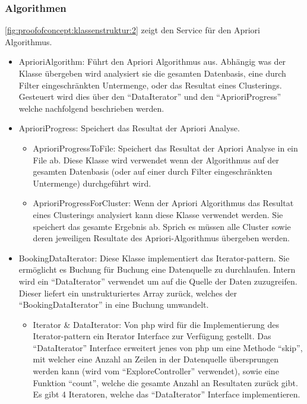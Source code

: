 \subsubsection{Algorithmen}
\label{sec:proofofconcept:klassenstruktur:algorithmen}
\cref{fig:proofofconcept:klassenstruktur:2} zeigt den Service für den Apriori Algorithmus.
\begin{itemize}
	\item AprioriAlgorithm: Führt den Apriori Algorithmus aus. Abhängig was der Klasse übergeben wird analysiert sie die gesamten Datenbasis, eine durch Filter eingeschränkten Untermenge, oder das Resultat eines Clusterings. Gesteuert wird dies über den "`DataIterator"' und den "`AprioriProgress"' welche nachfolgend beschrieben werden.
	\item AprioriProgress: Speichert das Resultat der Apriori Analyse. 
	\begin{itemize}
		\item AprioriProgressToFile: Speichert das Resultat der Apriori Analyse in ein File ab. Diese Klasse wird verwendet wenn der Algorithmus auf der gesamten Datenbasis (oder auf einer durch Filter eingeschränkten Untermenge) durchgeführt wird. 
		\item AprioriProgressForCluster: Wenn der Apriori Algorithmus das Resultat eines Clusterings analysiert kann diese Klasse verwendet werden. Sie speichert das gesamte Ergebnis ab. Sprich es müssen alle Cluster sowie deren jeweiligen Resultate des Apriori-Algorithmus übergeben werden.
	\end{itemize}
	\item BookingDataIterator: Diese Klasse implementiert das Iterator-\gls{pattern}. Sie ermöglicht es Buchung für Buchung eine Datenquelle zu durchlaufen. Intern wird ein "`DataIterator"' verwendet um auf die Quelle der Daten zuzugreifen. Dieser liefert ein unstrukturiertes Array zurück, welches der "`BookingDataIterator"' in eine Buchung umwandelt.
		\begin{itemize}
			\item Iterator \& DataIterator: Von \gls{php} wird für die Implementierung des Iterator-\gls{pattern} ein Iterator Interface zur Verfügung gestellt. Das "`DataIterator"' Interface erweitert jenes von \gls{php} um eine Methode "`skip"', mit welcher eine Anzahl an Zeilen in der Datenquelle übersprungen werden kann (wird vom "`ExploreController"' verwendet), sowie eine Funktion "`count"', welche die gesamte Anzahl an Resultaten zurück gibt. Es gibt 4 Iteratoren, welche das "`DataIterator"' Interface implementieren.

\end{itemize}
\end{itemize}
